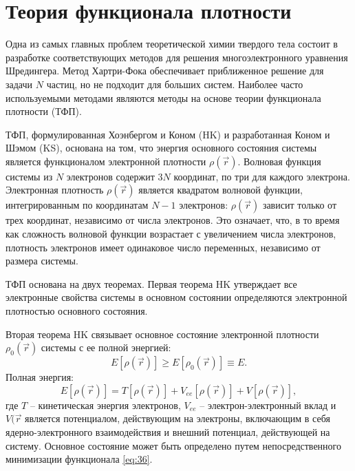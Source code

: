 \chapter{Теория функционала плотности}
Одна из самых главных проблем теоретической химии твердого тела состоит в разработке соответствующих методов для решения многоэлектронного уравнения Шредингера. Метод Хартри-Фока обеспечивает приближенное решение для задачи \(N\) частиц, но не подходит для больших систем. Наиболее часто используемыми методами являются методы на основе теории функционала плотности (ТФП).

ТФП, формулированная Хоэнбергом и Коном (HK) и разработанная Коном и Шэмом (KS), основана на том, что энергия основного состояния системы является функционалом электронной плотности \(\rho(\vec{r})\). Волновая функция системы из \(N\) электронов содержит \(3N\) координат, по три для каждого электрона. Электронная плотность \(\rho(\vec{r})\) является квадратом волновой функции, интегрированным по координатам \(N-1\) электронов: \(\rho(\vec{r})\) зависит только от трех координат, независимо от числа электронов. Это означает, что, в то время как сложность волновой функции возрастает с увеличением числа электронов, плотность электронов имеет одинаковое число переменных, независимо от размера системы.

ТФП основана на двух теоремах. Первая теорема HK утверждает все электронные свойства системы в основном состоянии определяются электронной плотностью основного состояния.

Вторая теорема HK связывает основное состояние электронной плотности \(\rho_0(\vec{r})\) системы с ее полной энергией:
\begin{equation*}
    E[\rho(\vec{r})] \ge E[\rho_0(\vec{r})] \equiv E.
\end{equation*}
Полная энергия:
\begin{equation}
    E[\rho(\vec{r})] = T[\rho(\vec{r})] + V_{ee}[\rho(\vec{r})]
                     + V[\rho(\vec{r})],
    \label{eq:36}
\end{equation}
где \(T\) -- кинетическая энергия электронов, \(V_{ee}\) -- электрон-электронный вклад и \(V(\vec{r}\) является потенциалом, действующим на электроны, включающим в себя ядерно-электронного взаимодействия и внешний потенциал, действующей на систему. Основное состояние может быть определено путем непосредственного минимизации функционала \eqref{eq:36}.

